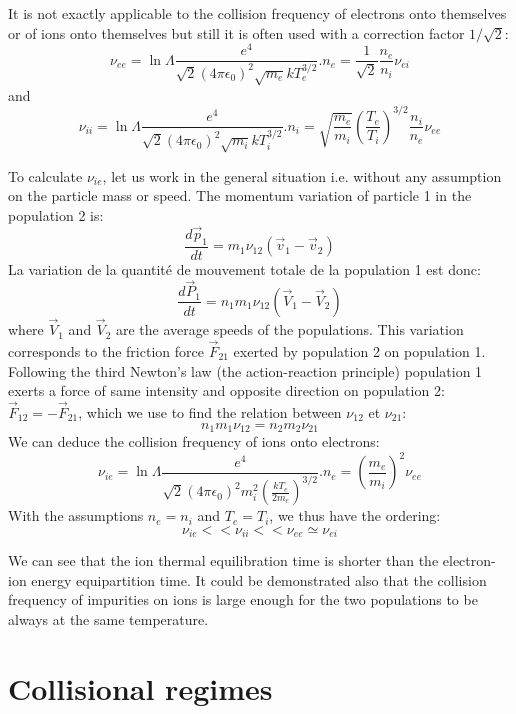 It is not exactly applicable to the collision frequency of electrons onto themselves or of ions onto themselves but still it is often used with a correction factor $1/\sqrt{2}$:
\[
		\nu_{ee} = \ln{\Lambda} \frac{e^4}{\sqrt{2}\left( 4\pi\epsilon_0 \right)^2 \sqrt{m_e} kT_e^{3/2}}.n_e = \frac{1}{\sqrt{2}} \frac{n_e}{n_i}\nu_{ei}
\]
and
\[
		\nu_{ii} = \ln{\Lambda} \frac{e^4}{\sqrt{2}\left( 4\pi\epsilon_0 \right)^2 \sqrt{m_i} kT_i^{3/2}}.n_i = \sqrt{\frac{m_e}{m_i}} \left( \frac{T_e}{T_i} \right)^{3/2} \frac{n_i}{n_e}\nu_{ee}
\]

To calculate $\nu_{ie}$, let us work in the general situation i.e. without any assumption on the particle mass or speed. The momentum variation of particle 1 in the population 2 is:
\[
\frac{d\vec{p}_1}{dt} = m_1 \nu_{12} \left( \vec{v}_1 - \vec{v}_2 \right)
\]
La variation de la quantité de mouvement totale de la population 1 est donc:
\[
\frac{d\vec{P}_1}{dt} = n_1 m_1 \nu_{12} \left( \vec{V}_1 - \vec{V}_2 \right)
\]
where $\vec{V}_1$ and $\vec{V}_2$ are the average speeds of the populations. This variation corresponds to the friction force $\vec{F}_{21}$ exerted by population 2 on population 1. Following the third Newton's law (the action-reaction principle) population 1 exerts a force of same intensity and opposite direction on population 2: $\vec{F}_{12} = - \vec{F}_{21}$, which we use to find the relation between $\nu_{12}$ et $\nu_{21}$:
\[
		n_1 m_1 \nu_{12} = n_2 m_2 \nu_{21}
\]
We can deduce the collision frequency of ions onto electrons:
\[
		\nu_{ie} = \ln{\Lambda} \frac{e^4}{\sqrt{2}\left( 4\pi\epsilon_0 \right)^2 m_i^2 \left(\frac{kT_e}{2m_e} \right)^{3/2}}.n_e = \left( \frac{m_e}{m_i} \right)^2 \nu_{ee}
\]
With the assumptions $n_e = n_i$ and $T_e = T_i$, we thus have the ordering:
\[
		\nu_{ie} << \nu_{ii} << \nu_{ee} \simeq \nu_{ei}
\]

We can see that the ion thermal equilibration time is shorter than the electron-ion energy equipartition time. It could be demonstrated also that the collision frequency of impurities on ions is large enough for the two populations to be always at the same temperature.






										
		\section{Collisional regimes}
		\label{sub:RegimesCollisionnels}
				
